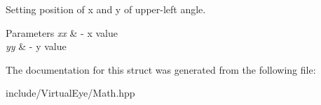 Setting position of x and y of upper-\/left angle. 


\begin{DoxyParams}{Parameters}
{\em xx} & -\/ x value \\
\hline
{\em yy} & -\/ y value \\
\hline
\end{DoxyParams}


The documentation for this struct was generated from the following file\+:\begin{DoxyCompactItemize}
\item 
include/\+Virtual\+Eye/Math.\+hpp\end{DoxyCompactItemize}
